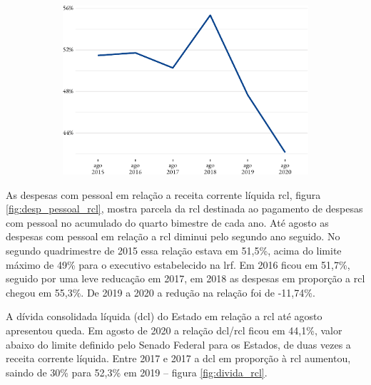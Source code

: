 \begin{figure}[!h]
\begin{subfigure}{\linewidth}
		\includegraphics{fig/desp_pessoal_rcl-1.pdf}
	\end{subfigure}
\end{figure}

As despesas com pessoal em relação a receita corrente líquida
\acrshort{rcl}, figura \ref{fig:desp_pessoal_rcl}, mostra parcela da
\acrshort{rcl} destinada ao pagamento de despesas com pessoal no
acumulado do quarto bimestre de cada ano. Até agosto as despesas com
pessoal em relação a \acrshort{rcl} diminui pelo segundo ano seguido. No
segundo quadrimestre de 2015 essa relação estava em 51,5\%, acima do
limite máximo de 49\% para o executivo estabelecido na \acrshort{lrf}.
Em 2016 ficou em 51,7\%, seguido por uma leve reducação em 2017, em 2018
as despesas em proporção a \acrshort{rcl} chegou em 55,3\%. De 2019 a
2020 a redução na relação foi de -11,74\%.

A dívida consolidada líquida (\acrshort{dcl}) do Estado em relação a
\acrshort{rcl} até agosto apresentou queda. Em agosto de 2020 a relação
\acrshort{dcl}/\acrshort{rcl} ficou em 44,1\%, valor abaixo do limite
definido pelo Senado Federal para os Estados, de duas vezes a receita
corrente líquida. Entre 2017 e 2017 a \acrshort{dcl} em proporção à
\acrshort{rcl} aumentou, saindo de 30\% para 52,3\% em 2019 -- figura
\ref{fig:divida_rcl}.

